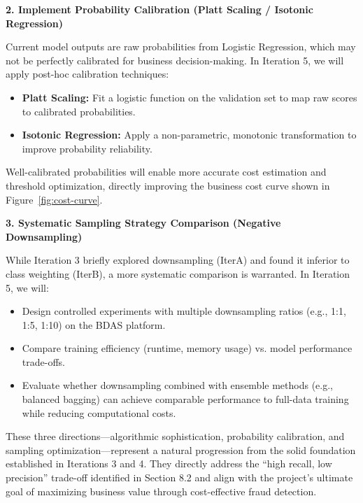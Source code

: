 \documentclass[sigplan,screen]{acmart}
\begin{document}
\textbf{2. Implement Probability Calibration (Platt Scaling / Isotonic Regression)}

Current model outputs are raw probabilities from Logistic Regression, which may not be perfectly calibrated for business decision-making. In Iteration 5, we will apply post-hoc calibration techniques:
\begin{itemize}
\item \textbf{Platt Scaling:} Fit a logistic function on the validation set to map raw scores to calibrated probabilities.
\item \textbf{Isotonic Regression:} Apply a non-parametric, monotonic transformation to improve probability reliability.
\end{itemize}
Well-calibrated probabilities will enable more accurate cost estimation and threshold optimization, directly improving the business cost curve shown in Figure~\ref{fig:cost-curve}.

\textbf{3. Systematic Sampling Strategy Comparison (Negative Downsampling)}

While Iteration 3 briefly explored downsampling (IterA) and found it inferior to class weighting (IterB), a more systematic comparison is warranted. In Iteration 5, we will:
\begin{itemize}
\item Design controlled experiments with multiple downsampling ratios (e.g., 1:1, 1:5, 1:10) on the BDAS platform.
\item Compare training efficiency (runtime, memory usage) vs. model performance trade-offs.
\item Evaluate whether downsampling combined with ensemble methods (e.g., balanced bagging) can achieve comparable performance to full-data training while reducing computational costs.
\end{itemize}

These three directions---algorithmic sophistication, probability calibration, and sampling optimization---represent a natural progression from the solid foundation established in Iterations 3 and 4. They directly address the ``high recall, low precision'' trade-off identified in Section 8.2 and align with the project's ultimate goal of maximizing business value through cost-effective fraud detection.
\end{document}
